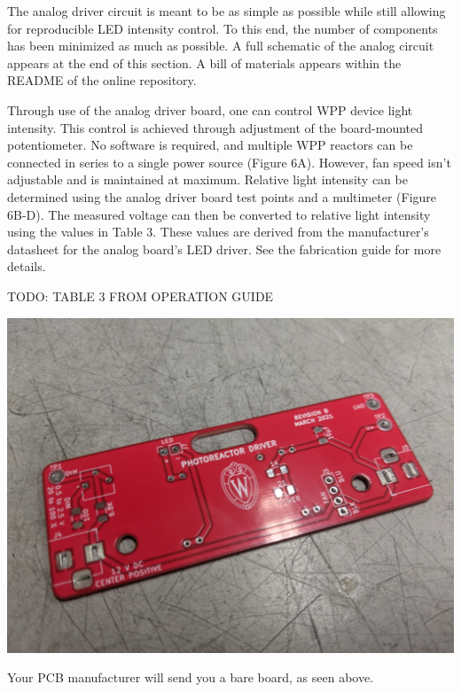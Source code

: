 \documentclass[11pt]{article}
\begin{document}
The analog driver circuit is meant to be as simple as possible while still allowing for reproducible LED intensity control.
To this end, the number of components has been minimized as much as possible.
A full schematic of the analog circuit appears at the end of this section.
A bill of materials appears within the README of the online repository.

Through use of the analog driver board, one can control WPP device light intensity.
This control is achieved through adjustment of the board-mounted potentiometer.
No software is required, and multiple WPP reactors can be connected in series to a single power source (Figure 6A).
However, fan speed isn’t adjustable and is maintained at maximum.
Relative light intensity can be determined using the analog driver board test points and a multimeter (Figure 6B-D).
The measured voltage can then be converted to relative light intensity using the values in Table 3.
These values are derived from the manufacturer’s datasheet for the analog board’s LED driver.
See the fabrication guide for more details.

TODO: TABLE 3 FROM OPERATION GUIDE

\begin{center}
  \includegraphics[width=\textwidth/2]{"./bare-pcb.jpg"}
\end{center}

Your PCB manufacturer will send you a bare board, as seen above.
\end{document}
